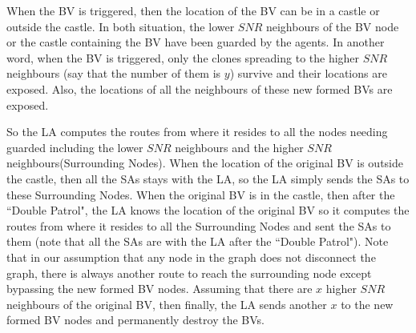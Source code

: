 
When the BV is triggered, then the location of the BV can be in a castle or outside the castle. In both situation, the lower $SNR$ neighbours of the BV node or the castle containing the BV have been guarded by the agents. In another word, when the BV is triggered, only the clones spreading to the higher $SNR$ neighbours (say that the number of them is $y$) survive and their locations are exposed. Also, the locations of all the neighbours of these new formed BVs are exposed. 

So the LA computes the routes from where it resides to all the nodes needing guarded including the lower $SNR$ neighbours and the higher $SNR$ neighbours(Surrounding Nodes). When the location of the original BV is outside the castle, then all the SAs stays with the LA, so the LA simply sends the SAs to these Surrounding Nodes. When the original BV is in the castle, then after the  ``Double Patrol", the LA knows the location of the original BV so it computes the routes from where it resides to all the Surrounding Nodes and sent the SAs to them (note that all the SAs are with the LA after the  ``Double Patrol"). Note that in our assumption that any node in the graph does not disconnect the graph, there is always another route to reach the surrounding node  except bypassing the new formed BV nodes. Assuming that there are $x$ higher $SNR$ neighbours of the original BV, then finally, the LA sends another $x$ to the new formed BV nodes and permanently destroy the BVs.









 